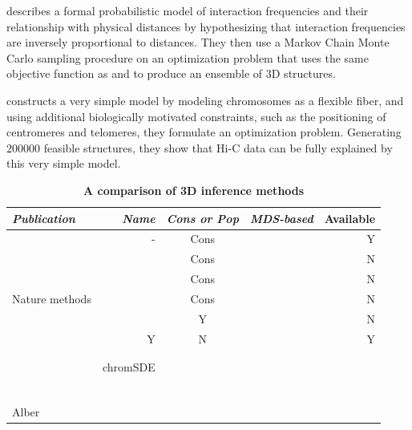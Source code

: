 \citet{rousseau:three} describes a formal probabilistic model of interaction
frequencies and their relationship with physical distances by hypothesizing
that interaction frequencies are inversely proportional to distances. They
then use a Markov Chain Monte Carlo sampling procedure on an optimization
problem that uses the same objective function as \citet{tanizawa:mapping} and
\citet{duan:three} to produce an ensemble of 3D structures.

\citet{tjong:physical} constructs a very simple model by modeling chromosomes
as a flexible fiber, and using additional biologically motivated constraints,
such as the positioning of centromeres and telomeres, they formulate an
optimization problem. Generating $200000$ feasible structures, they show that
Hi-C data can be fully explained by this very simple model.

\begin{table}[ht!]
\caption{\bf A comparison of 3D inference methods}
\begin{center}
\begin{tabular}{lrcrr}
\hline
\emph{Publication} & \emph{Name} & \emph{Cons or Pop} & \emph{MDS-based} & Available \\
\hline
\citet{duan:three} & - & Cons & & Y \\
\citet{tanizawa:mapping} & & Cons & & N \\
\citet{ay:three-dimensional} & & Cons & & N\\
Nature methods & & Cons & & N\\
\citet{ben-elazar:spatial} & & Y & & N \\
\citet{varoquaux:statistical} & Y & N & & Y\\
\citet{bau:three-dimensional} & & & &\\
\citet{umbarger:three-dimensional} & & & &\\
\citet{zhang:inference} & chromSDE & & &\\
\citet{rousseau:three} & & & &\\
\citet{hu:bayesian} & & & &\\
\citet{kalhor:genome} & & & &\\
\citet{tokuda:dynamical} & & & &\\
\citet{wong:predictive} & & & &\\
\citet{gehlen:chromosome} & & & &\\
Alber & & & &\\
\end{tabular}
\end{center}
\end{table}


